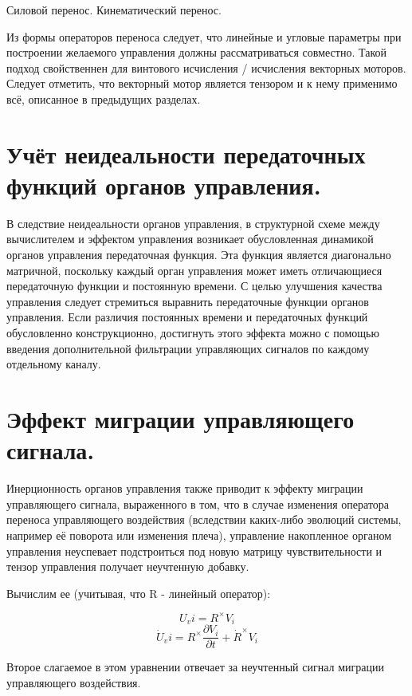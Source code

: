 \documentclass[a4paper]{article}
\begin{document}
Силовой перенос.
Кинематический перенос.

Из формы операторов переноса следует, что линейные и угловые параметры при построении желаемого управления должны рассматриваться совместно. Такой подход свойственнен для винтового исчисления / исчисления векторных моторов. Следует отметить, что векторный мотор является тензором и к нему применимо всё, описанное в предыдущих разделах.  

\section{Учёт неидеальности передаточных функций органов управления.}
В следствие неидеальности органов управления, в структурной схеме между вычислителем и эффектом управления возникает обусловленная динамикой органов управления передаточная функция. Эта функция является диагонально матричной, поскольку каждый орган управления может иметь отличающиеся передаточную функции и постоянную времени. С целью улучшения качества управления следует стремиться выравнить передаточные функции органов управления. Если различия постоянных времени и передаточных функций обусловленно конструкционно, достигнуть этого эффекта можно с помощью введения дополнительной фильтрации управляющих сигналов по каждому отдельному каналу.

\section{Эффект миграции управляющего сигнала.}
Инерционность органов управления также приводит к эффекту миграции управляющего сигнала, выраженного в том, что в случае изменения оператора переноса управляющего воздействия (вследствии каких-либо эволюций системы, например её поворота или изменения плеча), управление накопленное органом управления неуспевает подстроиться под новую матрицу чувствительности и тензор управления получает неучтенную добавку.

Вычислим ее (учитывая, что R - линейный оператор):

\begin{equation}U_vi = R^\times V_i\end{equation}
\begin{equation}\dot{U}_vi = R^\times \frac{\partial{V_i}}{\partial{t}} + \dot{R}^\times V_i\end{equation}

Второе слагаемое в этом уравнении отвечает за неучтенный сигнал миграции управляющего воздействия.  
\end{document}
